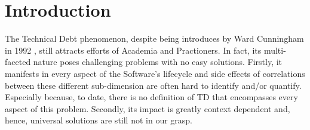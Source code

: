 \chapter{Introduction}

The Technical Debt phenomenon, despite being introduces by Ward Cunningham in 1992 \cite{first_mention_of_TD}, still attracts efforts of Academia and Practioners. In fact, its multi-faceted nature poses challenging problems with no easy solutions. Firstly, it manifests in every aspect of the Software's lifecycle and side effects of correlations between these different sub-dimension are often hard to identify and/or quantify. Especially because, to date, there is no definition of TD that encompasses every aspect of this problem. Secondly, its impact is greatly context dependent and, hence, universal solutions are still not in our grasp.

